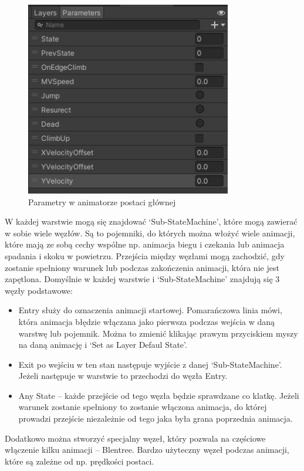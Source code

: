 \documentclass[12pt,twoside]{article}
\begin{document}
\begin{figure}[h]
    \centering
	\includegraphics[width=9cm]{RealizacjaProjektu/UnityPictires/Animator/Player1_Animator_Parameters.jpg}
	\caption{Parametry w animatorze postaci głównej}
    \label{Hero:Aniamtor:parameters}
\end{figure}


W każdej warstwie mogą się znajdować `Sub-StateMachine', które mogą zawierać w
sobie wiele węzłów. Są to pojemniki, do których można włożyć wiele animacji,
które mają ze sobą cechy wspólne np. animacja biegu i czekania lub animacja
spadania i skoku w powietrzu. Przejścia między węzłami mogą zachodzić, gdy
zostanie spełniony warunek lub podczas zakończenia animacji, która nie jest
zapętlona. Domyślnie w każdej warstwie i `Sub-StateMachine' znajdują się 3 węzły
podstawowe: 
\begin{itemize}
\item Entry służy do oznaczenia animacji startowej. Pomarańczowa linia mówi,
która animacja błędzie włączana jako pierwsza podczas wejścia w daną warstwę lub pojemnik.
Można to zmienić klikając prawym przyciskiem myszy na daną animację i `Set as
Layer Defaul State'.
\item Exit po wejściu w ten stan następuje wyjście z danej `Sub-StateMachine'.
Jeżeli następuje w warstwie to przechodzi do węzła Entry.
\item Any State -- każde przejście od tego węzła będzie sprawdzane co klatkę.
Jeżeli warunek zostanie spełniony to zostanie włączona animacja, do której
prowadzi przejście niezależnie od tego jaka była grana poprzednia animacja. 
\end{itemize}
Dodatkowo można stworzyć specjalny węzeł, który pozwala na częściowe włączenie
kilku animacji -- Blentree. Bardzo użyteczny węzeł podczas animacji, które są
zależne od np. prędkości postaci. 
\end{document}
